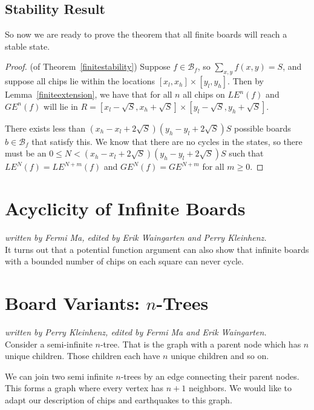 \documentclass[runningheads,a4paper]{llncs}
\begin{document}
\subsection{Stability Result}
So now we are ready to prove the theorem that all finite boards will reach a stable state. 

\begin{proof}
(of Theorem~\ref{finitestability}) Suppose $f \in \mathcal{B}_f$, so $\sum_{x,y} f(x,y) = S$, and suppose all chips lie within the locations $[x_l, x_h] \times [y_l, y_h]$. Then by Lemma~\ref{finiteextension}, we have that for all $n$ all chips on $LE^n(f)$ and $GE^n(f)$ will lie in $R = [x_l - \sqrt{S}, x_h + \sqrt{S}] \times [y_l - \sqrt{S}, y_h + \sqrt{S}]$. 

There exists less than $(x_h - x_l + 2\sqrt{S})(y_h - y_l + 2\sqrt{S})S$ possible boards $b \in \mathcal{B}_f$ that satisfy this. We know that there are no cycles in the states, so there must be an $0 \leq N < (x_h - x_l + 2\sqrt{S})(y_h - y_l + 2\sqrt{S})S$ such that $LE^N(f) = LE^{N+m}(f)$ and $GE^N(f)=GE^{N+m}$ for all $m \geq 0$.
\end{proof}

\section{Acyclicity of Infinite Boards}

\emph{written by Fermi Ma, edited by Erik Waingarten and Perry Kleinhenz.}\\

It turns out that a potential function argument can also show that infinite boards with a bounded number of chips on each square can never cycle.


\section{Board Variants: $n$-Trees}
\emph{written by Perry Kleinhenz, edited by Fermi Ma and Erik Waingarten.}\\

Consider a semi-infinite $n$-tree. That is the graph with a parent node which has $n$ unique children. Those children each have $n$ unique children and so on. 

We can join two semi infinite $n$-trees by an edge connecting their parent nodes. This forms a graph where every vertex has $n+1$ neighbors. We would like to adapt our description of chips and earthquakes to this graph. 
\end{document}
